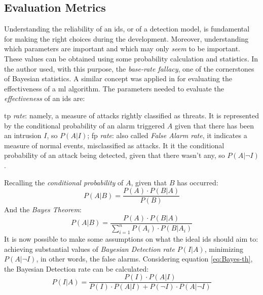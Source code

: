 \subsection{Evaluation Metrics}
\label{subsec:detection-rates}

Understanding the reliability of an \gls{ids}, or of a detection model, is fundamental for making the right choices during the development. Moreover, understanding which parameters are important and which may only \textit{seem} to be important. These values can be obtained using some probability calculation and statistics. In \cite{Axelsson2000} the author used, with this purpose, the \textit{base-rate fallacy}, one of the cornerstones of Bayesian statistics. A similar concept was applied in \cite{Liu2019} for evaluating the effectiveness of a \gls{ml} algorithm. The parameters needed to evaluate the \textit{effectiveness} of an \gls{ids} are:
\begin{itemize}
    \itemAR \gls{tp} \textit{rate}: namely, a measure of attacks rightly classified as threats. It is represented by the conditional probability of an alarm triggered $A$ given that there has been an intrusion $I$, so $P(A|I)$;
    \itemAR \gls{fp} \textit{rate}: also called \textit{False Alarm rate}, it indicates a measure of normal events, misclassified as attacks. It it the conditional probability of an attack being detected, given that there wasn't any, so $P(A|\neg I)$.
\end{itemize}
Recalling the \textit{conditional probability} of $A$, given that $B$ has occurred:
\begin{equation}
    P(A|B)=\frac{P(A)\cdot P(B|A)}{P(B)}
    \label{eq:conditional-prob}
\end{equation}
And the \textit{Bayes Theorem}:
\begin{equation}
    P(A|B)=\frac{P(A)\cdot P(B|A)}{\sum_{i=1}^nP(A_i)\cdot P(B|A_i)}
    \label{eq:Bayes-th}
\end{equation}
It is now possible to make some assumptions on what the ideal \gls{ids} should aim to: achieving substantial values of \textit{Bayesian Detection rate} $P(I|A)$, minimizing $P(A|\neg I)$, in other words, the false alarms. Considering equation \ref{eq:Bayes-th}, the Bayesian Detection rate can be calculated:
\begin{equation}
    P(I|A)=\frac{P(I)\cdot P(A|I)}{P(I)\cdot P(A|I)+ P(\neg I)\cdot P(A|\neg I)}
    \label{eq:Bayesian-detection-rate}
\end{equation}
